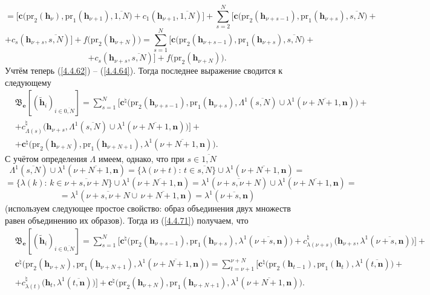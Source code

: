 \documentclass[12pt,twoside]{report}
\newcommand{\ov}{\overline}
\newcommand{\La}{\Lambda}
\newcommand{\la}{\lambda}
\begin{document}
{{$$$$
$$
= \bigl[\mathbf{c}\bigl(\mathrm{pr}_2(\mathbf{h}_\nu),\mathrm{pr}_1(\mathbf{h}_{\nu+1}),
\ov{1,N}\bigl) + c_1(\mathbf{h}_{\nu+1},\ov{1,N})\bigl] +
\sum\limits_{s=2}^N\bigl[\mathbf{c}\bigl(\mathrm{pr}_2(\mathbf{h}_{\nu+s-1}),\mathrm{pr}_1
(\mathbf{h}_{\nu+s}),\ov{s,N}\bigl) +
$$
$$
+ c_s(\mathbf{h}_{\nu+s},\ov{s,N})\bigl]
+f\bigl(\mathrm{pr}_2(\mathbf{h}_{\nu+N})\bigl) =
\sum\limits_{s=1}^N\bigl[\mathbf{c}\bigl(\mathrm{pr}_2(\mathbf{h}_{\nu+s-1}),\mathrm{pr}_1
(\mathbf{h}_{\nu+s}),\ov{s,N}\bigl)+
$$
$$+ c_s(\mathbf{h}_{\nu+s},\ov{s,N})\bigl] + f\bigl(\mathrm{pr}_2(\mathbf{h}_{\nu+N})\bigl).
$$
Учтём теперь (\ref{4.4.62}) -- (\ref{4.4.64}). Тогда последнее выражение сводится к следующему
\begin{eqnarray}
&\mathfrak{B}_\mathbf{e}[(\tilde{\mathbf{h}}_i)_{i\in\ov{0,N}}]=
\sum\limits_{s=1}^N \bigl[\mathbf{c}^\natural\bigl(\mathrm{pr}_2(\mathbf{h}_{\nu+s-1}),
\mathrm{pr}_1(\mathbf{h}_{\nu+s}),
\La^1(\ov{s,N})\cup \la^1(\ov{\nu+N+1,\mathbf{n}})\bigl) +
&\nonumber\\
&+ c_{\La(s)}^\natural\bigl(\mathbf{h}_{\nu+s},\La^1(\ov{s,N}) \cup \la^1(\ov{\nu+N+1,\mathbf{n}})\bigl)\bigl]+
&\nonumber\\
&+ \mathbf{c}^\natural\bigl(\mathrm{pr}_2(\mathbf{h}_{\nu+N}),\mathrm{pr}_1(\mathbf{h}_{\nu+N+1}),
\la^1(\ov{\nu+N+1,\mathbf{n}})\bigl).
&\label{4.4.71}
\end{eqnarray}
С учётом определения $\La$ имеем, однако, что при $s\in\ov{1,N}$
$$\La^1(\ov{s,N}) \cup \la^1(\ov{\nu+N+1,\mathbf{n}}) = \{\la(\nu+t):\,t\in \ov{s,N}\} \cup
\la^1(\ov{\nu+N+1,\mathbf{n}}) =
$$
$$=\{\la(k):\,k\in\ov{\nu+s,\nu+N}\} \cup \la^1(\ov{\nu+N+1,\mathbf{n}})=
\la^1(\ov{\nu+s,\nu+N}) \cup \la^1(\ov{\nu+N+1,\mathbf{n}}) =$$
$$= \la^1(\ov{\nu+s,\nu+N} \cup\, \ov{\nu+N+1,\mathbf{n}}) = \la^1(\ov{\nu+s,
\mathbf{n}})
$$
(используем следующее простое свойство: образ объединения двух множеств равен
объединению их образов). Тогда из (\ref{4.4.71}) получаем, что
\begin{eqnarray}
&\mathfrak{B}_\mathbf{e}[(\tilde{\mathbf{h}}_i)_{i\in\ov{0,N}}]=
\sum\limits_{s=1}^N \bigl[\mathbf{c}^\natural\bigl(\mathrm{pr}_2(\mathbf{h}_{\nu+s-1}),
\mathrm{pr}_1(\mathbf{h}_{\nu+s}),
\la^1(\ov{\nu+s,\mathbf{n}})\bigl) + c_{\la(\nu+s)}^\natural(\mathbf{h}_{\nu+s},
\la^1(\ov{\nu+s,\mathbf{n}})\bigl)\bigl] +
&\nonumber\\
&\mathbf{c}^\natural\bigl(\mathrm{pr}_2(\mathbf{h}_{\nu+N}),\mathrm{pr}_1(\mathbf{h}_{\nu+N+1}),
\la^1(\ov{\nu+N+1,\mathbf{n}})\bigl) =
\sum\limits_{t=\nu+1}^{\nu+N}\bigl[\mathbf{c}^\natural\bigl(\mathrm{pr}_2(\mathbf{h}_{t-1}),
\mathrm{pr}_1(\mathbf{h}_t),\la^1(\ov{t,\mathbf{n}})\bigl)+
&\nonumber\\
&+ c_{\la(t)}^\natural\bigl(\mathbf{h}_t,\la^1(\ov{t,\mathbf{n}})\bigl)\bigl] +
\mathbf{c}^\natural\bigl(\mathrm{pr}_2(\mathbf{h}_{\nu+N}),\mathrm{pr}_1(\mathbf{h}_{\nu+N+1}),
\la^1(\ov{\nu+N+1,\mathbf{n}})\bigl).
&\label{4.4.72}
\end{eqnarray}

}}
\end{document}
